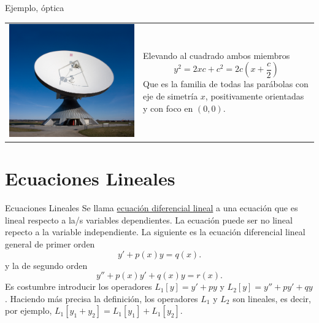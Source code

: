 \documentclass[handout,hyperref={colorlinks=true}]{beamer}
\begin{document}
\begin{frame}{Ejemplo, óptica}
 \begin{tabular}{m{4cm} m{5cm}}
 \includegraphics[scale=.15]{imagenes/antena.jpg} & Elevando al cuadrado ambos miembros
\[y^2=2xc+c^2=2c\left(x+\frac{c}{2}\right)\]
Que es la familia de todas las parábolas con eje de simetría $x$, positivamente orientadas y con foco en $(0,0)$. \\
 \end{tabular}
 \end{frame}
\section{Ecuaciones Lineales}

\begin{frame}{Ecuaciones Lineales}
Se llama \href{http://es.wikipedia.org/wiki/Ecuación_diferencial_lineal}{ecuación diferencial lineal} a una ecuación que es lineal
respecto a   la/s variables
dependientes. La ecuación puede ser no lineal repecto a la variable independiente. 
La siguiente es la ecuación diferencial lineal general de primer orden
\begin{equation}\label{eq:lineal}y'+p(x)y=q(x).
\end{equation}
y la  de segundo orden
\[y''+p(x)y'+q(x)y=r(x).\]
Es costumbre introducir los operadores  $L_1[y]=y'+py$  y $ L_2[y]=y''+py'+qy$. 
Haciendo más precisa la definición, los operadores $L_1$ y $L_2$ son lineales, es decir, por ejemplo, $L_1[y_1+y_2]=L_1[y_1]+L_1[y_2]$. 
\end{frame}
\end{document}

